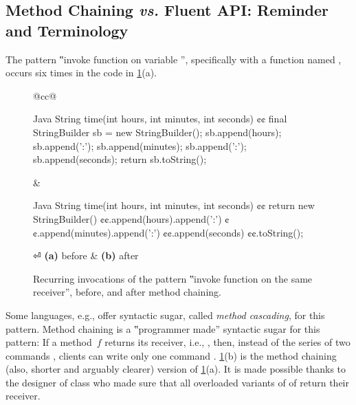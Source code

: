\subsection{Method Chaining \emph{vs.} Fluent API: Reminder and Terminology}
The pattern ‟invoke function on variable ”, specifically with
  a function named , occurs
six times in the code in \cref{Figure:chaining}(a).

\begin{figure}[H]
  \caption{\label{Figure:chaining}%
    Recurring invocations of the pattern ‟invoke function on the same
      receiver”, before, and after method chaining.
  }%
    \begin{tabular}{@{}cc@{}}%
  \begin{lcode}[minipage,width=44ex,box align=center]{Java}
String time(int hours, int minutes, int seconds) {¢¢
  final StringBuilder sb = new StringBuilder();
  sb.append(hours);
  sb.append(':');
  sb.append(minutes);
  sb.append(':');
  sb.append(seconds);
  return sb.toString();
}\end{lcode}
\hfill
&
\hspace{1ex}
  \begin{lcode}[minipage,width=44ex,box align=center]{Java}
String time(int hours, int minutes, int seconds) {¢¢
    return new StringBuilder()
      ¢¢.append(hours).append(':')
      ¢¢.append(minutes).append(':')
      ¢¢.append(seconds)
      ¢¢.toString();
}\end{lcode}
⏎
\textbf{(a)} before & \textbf{(b)} after
\end{tabular}
\end{figure}

Some languages, e.g., \Smalltalk offer syntactic sugar, called \emph{method cascading}, for this pattern.
Method chaining is a ‟programmer made” syntactic sugar for this pattern:
  If a method~$f$ returns its receiver, i.e., ,
  then, instead of the series of two commands \mbox{}, clients can write
  only one command \mbox{}.
  \cref{Figure:chaining}(b) is the method chaining
  (also, shorter and arguably clearer) version of
  \cref{Figure:chaining}(a).
It is made possible thanks to the designer of class  who made sure that all overloaded variants of
  of  return their receiver.

